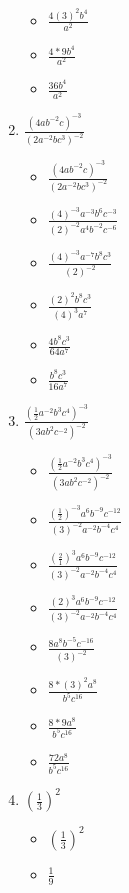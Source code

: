 \begin{enumerate}
\begin{itemize}
  \item {\Large $\frac{4(3)^{2}b^{4}}{a^{2}}$}
  \item {\Large $\frac{4*9b^{4}}{a^{2}}$}
  \item {\Large $\frac{36b^{4}}{a^{2}}$}
  \end{itemize}
\item {\Large $\frac{(4ab^{-2}c)^{-3}}{(2a^{-2}bc^{3})^{-2}}$}
  \begin{itemize}
  \item {\Large $\frac{(4ab^{-2}c)^{-3}}{(2a^{-2}bc^{3})^{-2}}$}
  \item {\Large $\frac{(4)^{-3}a^{-3}b^{6}c^{-3}}{(2)^{-2}a^{4}b^{-2}c^{-6}}$}
  \item {\Large $\frac{(4)^{-3}a^{-7}b^{8}c^{3}}{(2)^{-2}}$}
  \item {\Large $\frac{(2)^{2}b^{8}c^{3}}{(4)^{3}a^{7}}$}
  \item {\Large $\frac{4b^{8}c^{3}}{64a^{7}}$}
  \item {\Large $\frac{b^{8}c^{3}}{16a^{7}}$}
  \end{itemize}
\item {\Large $\frac{(\frac{1}{2}a^{-2}b^{3}c^{4})^{-3}}{(3ab^{2}c^{-2})^{-2}}$}
  \begin{itemize}
  \item {\Large $\frac{(\frac{1}{2}a^{-2}b^{3}c^{4})^{-3}}{(3ab^{2}c^{-2})^{-2}}$}
  \item {\Large $\frac{(\frac{1}{2})^{-3}a^{6}b^{-9}c^{-12}}{(3)^{-2}a^{-2}b^{-4}c^{4}}$}
  \item {\Large $\frac{(\frac{2}{1})^{3}a^{6}b^{-9}c^{-12}}{(3)^{-2}a^{-2}b^{-4}c^{4}}$}
  \item {\Large $\frac{(2)^{3}a^{6}b^{-9}c^{-12}}{(3)^{-2}a^{-2}b^{-4}c^{4}}$}
  \item {\Large $\frac{8a^{8}b^{-5}c^{-16}}{(3)^{-2}}$}
  \item {\Large $\frac{8*(3)^{2}a^{8}}{b^{5}c^{16}}$}
  \item {\Large $\frac{8*9a^{8}}{b^{5}c^{16}}$}
  \item {\Large $\frac{72a^{8}}{b^{5}c^{16}}$}
  \end{itemize}
\item {\Large $(\frac{1}{3})^{2}$}
  \begin{itemize}
  \item {\Large $(\frac{1}{3})^{2}$}
  \item {\Large $\frac{1}{9}$}
  \end{itemize}

\end{enumerate}
